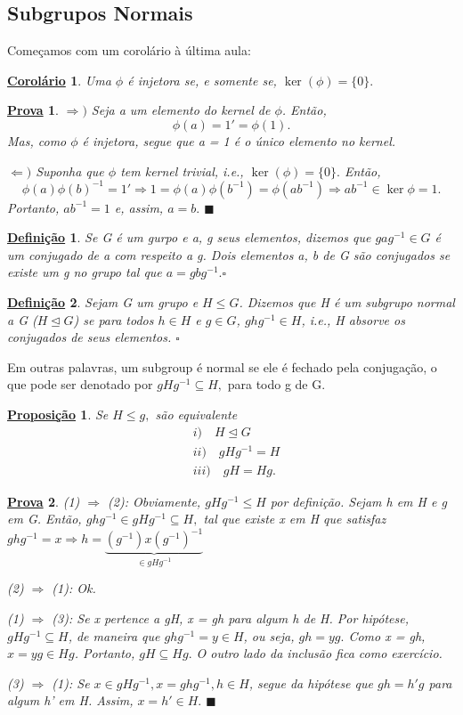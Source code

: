 \documentclass{article}
\newtheorem*{def*}{\underline{Defini\c c\~ao}}
\newtheorem*{prop*}{\underline{Proposi\c c\~ao}}
\newtheorem*{crl*}{\underline{Corol\'ario}}
\newtheorem*{proof*}{\underline{Prova}}
\renewcommand\qedsymbol{$\blacksquare$}
\begin{document}
\subsection{Subgrupos Normais}
  Come\c camos com um corol\'ario \`a \'ultima aula:
 \begin{crl*}
   Uma $\phi$ \'e injetora se, e somente se, $\ker{(\phi)} =\{0\}.$
 \end{crl*}
\begin{proof*}
  $ \Rightarrow)$ Seja a um elemento do kernel de $\phi$. Ent\~ao, 
    $$
      \phi(a) = 1' = \phi(1).
    $$
    Mas, como $\phi$ \'e injetora, segue que a = 1 \'e o \'unico elemento no kernel.

  $ \Leftarrow)$ Suponha que $\phi$ tem kernel trivial, i.e., $\ker{(\phi)} =\{0\}.$ Ent\~ao,
    $$
    \phi(a)\phi(b)^{-1} = 1' \Rightarrow 1 = \phi(a)\phi(b^{-1}) = \phi(ab^{-1}) \Rightarrow ab^{-1}\in\ker{\phi} = {1}.
    $$
    Portanto, $ab^{-1} = 1$ e, assim, $a = b.$ \qedsymbol
\end{proof*}
 \begin{def*}
   Se G \'e um gurpo e a, g seus elementos, dizemos que $gag^{-1}\in G$ \'e um conjugado de a com respeito a g. Dois elementos a, b
  de G s\~ao conjugados se existe um g no grupo tal que $a = g b g^{-1}.\square$
 \end{def*}
 \begin{def*}
   Sejam G um grupo e $H\leq{G}$. Dizemos que H \'e um subgrupo normal a G ($H\trianglelefteq G$) se para todos $h\in H$ e $g\in G$,
  $ghg^{-1}\in H$, i.e., H absorve os conjugados de seus elementos. $\square$
 \end{def*}
  Em outras palavras, um subgroup \'e normal se ele \'e fechado pela conjuga\c c\~ao, o que pode ser denotado por $gHg^{-1}\subseteq{H},$ para todo
g de G.
 \begin{prop*}
   Se $H\leq{g},$ s\~ao equivalente
  \begin{align*}
    &i)\quad H\trianglelefteq{G} \\
    &ii)\quad gHg^{-1} = H\\
    &iii)\quad gH = Hg.
  \end{align*}
 \end{prop*}
\begin{proof*}
  (1) $ \Rightarrow$ (2): Obviamente, $gHg^{-1}\leq{H}$ por defini\c c\~ao. Sejam h em H e g em G. Ent\~ao, $ghg^{-1}\in gHg^{-1}\subseteq{H},$
  tal que existe x em H que satisfaz $ghg^{-1} = x \Rightarrow h = \underbrace{(g^{-1})x(g^{-1})^{-1}}_{\in gHg^{-1}}$

  (2) $ \Rightarrow$ (1): Ok.

  (1) $ \Rightarrow$ (3): Se x pertence a gH, x = gh para algum h de H. Por hip\'otese, $gHg^{-1}\subseteq{H}$, de maneira que
 $ghg^{-1} = y\in H$, ou seja, $gh = yg.$ Como x = gh, $x = yg\in Hg$. Portanto, $gH\subseteq{Hg}.$ O outro lado da inclus\~ao fica como exerc\'icio.

  (3) $\Rightarrow$ (1): Se $x\in gHg^{-1}, x = ghg^{-1}, h\in H$, segue da hip\'otese que $gh = h'g$ para algum h' em H. Assim,
  $x = h'\in H.$ \qedsymbol
\end{proof*}
\end{document}
